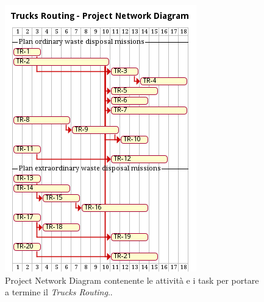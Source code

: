 \begin{figure}[H]
    \centering
    \includegraphics[width=\textwidth]{../img/gantt-trucks-routing.pm}
    \caption{Project Network Diagram contenente le attività e i task per portare a termine il \textit{Trucks Routing}..}
    \label{fig:gantt-trucks-routing}
\end{figure}

